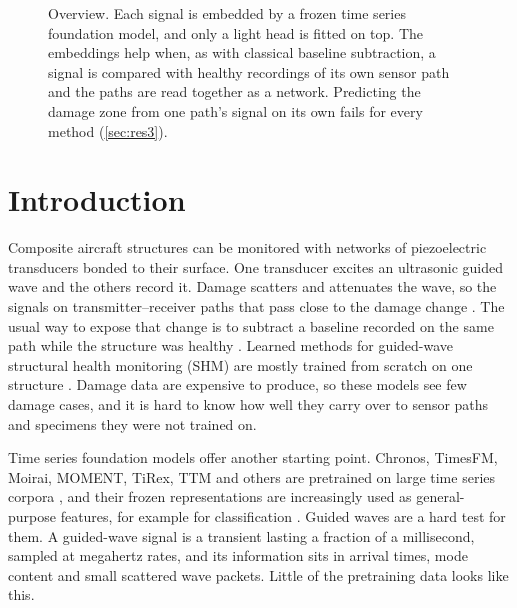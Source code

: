\documentclass{article}
\begin{document}
\begin{figure}[t]
{}
  \caption{Overview. Each signal is embedded by a frozen time series foundation model, and only a light
  head is fitted on top. The embeddings help when, as with classical baseline subtraction, a signal is
  compared with healthy recordings of its own sensor path and the paths are read together as a network.
  Predicting the damage zone from one path's signal on its own fails for every method
  (\cref{sec:res3}).}
  \label{fig:overview}
\end{figure}

\section{Introduction}
\label{sec:intro}

Composite aircraft structures can be monitored with networks of piezoelectric transducers bonded to
their surface. One transducer excites an ultrasonic guided wave and the others record it. Damage scatters
and attenuates the wave, so the signals on transmitter--receiver paths that pass close to the damage
change \citep{mitra2016review}. The usual way to expose that change is to subtract a baseline recorded on
the same path while the structure was healthy \citep{croxford2007strategies}. Learned methods for
guided-wave structural health monitoring (SHM) are mostly trained from scratch on one structure
\citep{xu2019crack,rautela2021combined,rautela2022delamination}. Damage data are expensive to produce,
so these models see few damage cases, and it is hard to know how well they carry over to sensor paths
and specimens they were not trained on.

Time series foundation models offer another starting point. Chronos, TimesFM, Moirai, MOMENT, TiRex,
TTM and others are pretrained on large time series corpora
\citep{ansari2024chronos,das2024timesfm,woo2024moirai,goswami2024moment,auer2025tirex,ekambaram2024ttm},
and their frozen representations are increasingly used as general-purpose features, for example for
classification \citep{goswami2024moment,feofanov2026mantis}. Guided waves are a hard test for them. A
guided-wave signal is a transient lasting a fraction of a millisecond, sampled at megahertz rates, and
its information sits in arrival times, mode content and small scattered wave packets. Little of the
pretraining data looks like this.
\end{document}
